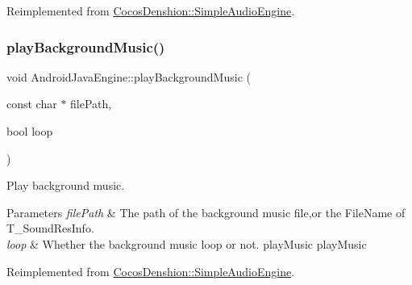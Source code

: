 Reimplemented from \hyperlink{classCocosDenshion_1_1SimpleAudioEngine_a44346159dae470e131ea1046aca63937}{Cocos\+Denshion\+::\+Simple\+Audio\+Engine}.

\mbox{\label{classCocosDenshion_1_1android_1_1AndroidJavaEngine_a510170bb28df6e2035ad479831e6ef33}} 
\subsubsection{\texorpdfstring{play\+Background\+Music()}{playBackgroundMusic()}\hspace{0.1cm}{\footnotesize\ttfamily [1/2]}}
{\footnotesize\ttfamily void Android\+Java\+Engine\+::play\+Background\+Music (\begin{DoxyParamCaption}\item[{const char $\ast$}]{file\+Path,  }\item[{bool}]{loop }\end{DoxyParamCaption})\hspace{0.3cm}{\ttfamily [virtual]}}

Play background music.


\begin{DoxyParams}{Parameters}
{\em file\+Path} & The path of the background music file,or the File\+Name of T\+\_\+\+Sound\+Res\+Info. \\
\hline
{\em loop} & Whether the background music loop or not.  play\+Music  play\+Music \\
\hline
\end{DoxyParams}


Reimplemented from \hyperlink{classCocosDenshion_1_1SimpleAudioEngine_a579246d2298b943adf49a2c4faaf25ea}{Cocos\+Denshion\+::\+Simple\+Audio\+Engine}.

\mbox{\label{classCocosDenshion_1_1android_1_1AndroidJavaEngine_aeb8086c0fa8689075d4e2d2bf05f9439}} 
